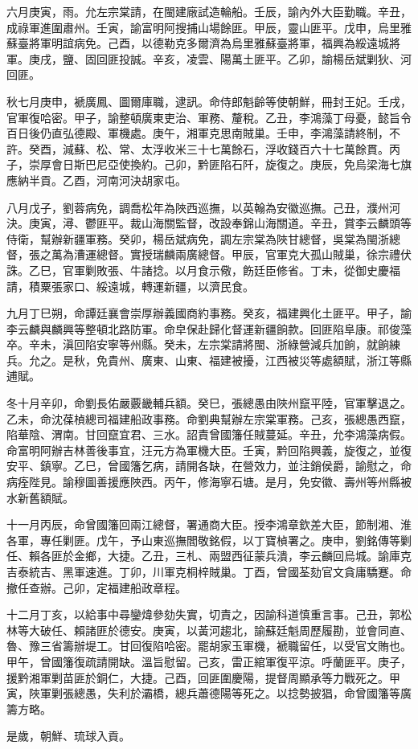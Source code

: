 \begin{pinyinscope}
六月庚寅，雨。允左宗棠請，在閩建廠試造輪船。壬辰，諭內外大臣勤職。辛丑，成祿軍進圍肅州。壬寅，諭富明阿搜捕山場餘匪。甲辰，靈山匪平。戊申，烏里雅蘇臺將軍明誼病免。己酉，以德勒克多爾濟為烏里雅蘇臺將軍，福興為綏遠城將軍。庚戌，鹽、固回匪投誠。辛亥，凌雲、陽萬土匪平。乙卯，諭楊岳斌剿狄、河回匪。

秋七月庚申，褫廣鳳、圖爾庫職，逮訊。命侍郎魁齡等使朝鮮，冊封王妃。壬戌，官軍復哈密。甲子，諭整頓廣東吏治、軍務、釐稅。乙丑，李鴻藻丁母憂，懿旨令百日後仍直弘德殿、軍機處。庚午，湘軍克思南賊巢。壬申，李鴻藻請終制，不許。癸酉，減蘇、松、常、太浮收米三十七萬餘石，浮收錢百六十七萬餘貫。丙子，崇厚會日斯巴尼亞使換約。己卯，黔匪陷石阡，旋復之。庚辰，免烏梁海七旗應納半貢。乙酉，河南河決胡家屯。

八月戊子，劉蓉病免，調喬松年為陜西巡撫，以英翰為安徽巡撫。己丑，濮州河決。庚寅，潯、鬱匪平。裁山海關監督，改設奉錦山海關道。辛丑，賞李云麟頭等侍衛，幫辦新疆軍務。癸卯，楊岳斌病免，調左宗棠為陜甘總督，吳棠為閩浙總督，張之萬為漕運總督。實授瑞麟兩廣總督。甲辰，官軍克大孤山賊巢，徐宗禮伏誅。乙巳，官軍剿敗張、牛諸捻。以月食示儆，飭廷臣修省。丁未，從御史慶福請，積粟張家口、綏遠城，轉運新疆，以濟民食。

九月丁巳朔，命譚廷襄會崇厚辦義國商約事務。癸亥，福建興化土匪平。甲子，諭李云麟與麟興等整頓北路防軍。命皁保赴歸化督運新疆餉款。回匪陷阜康。祁俊藻卒。辛未，滇回陷安寧等州縣。癸未，左宗棠請將閩、浙綠營減兵加餉，就餉練兵。允之。是秋，免貴州、廣東、山東、福建被擾，江西被災等處額賦，浙江等縣逋賦。

冬十月辛卯，命劉長佑嚴覈畿輔兵額。癸巳，張總愚由陜州竄平陸，官軍擊退之。乙未，命沈葆楨總司福建船政事務。命劉典幫辦左宗棠軍務。己亥，張總愚西竄，陷華陰、渭南。甘回竄宜君、三水。詔責曾國籓任賊蔓延。辛丑，允李鴻藻病假。命富明阿辦吉林善後事宜，汪元方為軍機大臣。壬寅，黔回陷興義，旋復之，並復安平、鎮寧。乙巳，曾國籓乞病，請開各缺，在營效力，並注銷侯爵，諭慰之，命病痊陛見。諭穆圖善援應陜西。丙午，修海寧石塘。是月，免安徽、壽州等州縣被水新舊額賦。

十一月丙辰，命曾國籓回兩江總督，署通商大臣。授李鴻章欽差大臣，節制湘、淮各軍，專任剿匪。戊午，予山東巡撫閻敬銘假，以丁寶楨署之。庚申，劉銘傳等剿任、賴各匪於金鄉，大捷。乙丑，三札、兩盟西征蒙兵潰，李云麟回烏城。諭庫克吉泰統吉、黑軍速進。丁卯，川軍克桐梓賊巢。丁酉，曾國荃劾官文貪庸驕蹇。命撤任查辦。己卯，定福建船政章程。

十二月丁亥，以給事中尋鑾煒參劾失實，切責之，因諭科道慎重言事。己丑，郭松林等大破任、賴諸匪於德安。庚寅，以黃河趨北，諭蘇廷魁周歷履勘，並會同直、魯、豫三省籌辦堤工。甘回復陷哈密。罷胡家玉軍機，褫職留任，以受官文賄也。甲午，曾國籓復疏請開缺。溫旨慰留。己亥，雷正綰軍復平涼。呼蘭匪平。庚子，援黔湘軍剿苗匪於銅仁，大捷。己酉，回匪圍慶陽，提督周顯承等力戰死之。甲寅，陜軍剿張總愚，失利於灞橋，總兵蕭德陽等死之。以捻勢披猖，命曾國籓等廣籌方略。

是歲，朝鮮、琉球入貢。


\end{pinyinscope}